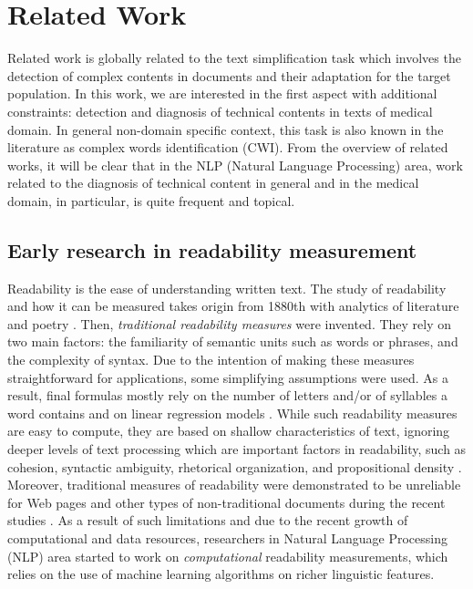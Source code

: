 \chapter{Related Work}
\label{ch:related-work}

Related work is globally related to the text simplification task which involves the detection of complex contents in documents and their adaptation for the target population. In this work, we are interested in the first aspect with additional constraints: detection and diagnosis of technical contents in texts of medical domain. In general non-domain specific context, this task is also known in the literature as complex words identification (CWI). From the overview of related works, it will be clear that in the NLP (Natural Language Processing) area, work related to the diagnosis of technical content in general and in the medical domain, in particular, is quite frequent and topical. 


\section{Early research in readability measurement}

Readability is the ease of understanding written text. The study of readability and how it can be measured takes origin from 1880th with analytics of literature and poetry \citep{Sherman-1893}. Then,  \textit{traditional readability measures} were invented. They rely on two main factors: the familiarity of semantic units such as words or
phrases, and the complexity of syntax. Due to the intention of making these measures straightforward for applications, some simplifying assumptions were used. As a result, final formulas mostly rely on the number of letters and/or of syllables a word contains and on linear regression models \citep{Flesch1948,Gunning1973}. While such readability measures are easy to compute, they are based on shallow characteristics of text, ignoring deeper levels of text processing which are important factors in readability, such as cohesion, syntactic ambiguity, rhetorical organization, and propositional density \citep{Collins-2014}. Moreover, traditional measures of readability were demonstrated to be unreliable for Web pages and other types of non-traditional documents during the recent studies \citep{Si-2001}. As a result of such limitations and due to the recent growth of computational and data resources,  researchers in Natural Language Processing (NLP) area started to work on \textit{computational} readability measurements, which relies on the use of machine learning algorithms on richer linguistic features.



